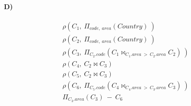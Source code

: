 \documentclass[a4paper,12pt]{article}
\begin{document}
	\paragraph{D)}
	\begin{align*}
		\rho(C_{1},\ \Pi_{code,\ area}(Country)\ ) \\
		\rho(C_{2},\ \Pi_{code,\ area}(Country)\ ) \\
		\rho(C_{3},\ \Pi_{C_{2}.code}(C_{1} \Join_{C_{1}.area\ >\ C_{2}.area} C_{2})\ )\\				
		\rho(C_{4},\ C_{2} \Join C_{3}) \\	
		\rho(C_{5},\ C_{2} \Join C_{3}) \\
		\rho(C_{6},\ \Pi_{C_{5}.code}(C_{4} \Join_{C_{4}.area\ >\ C_{3}.area} C_{3})\ ) \\
		\Pi_{C_{3}.area}(C_{3})\ -\ C_{6}
	\end{align*}
\end{document}
